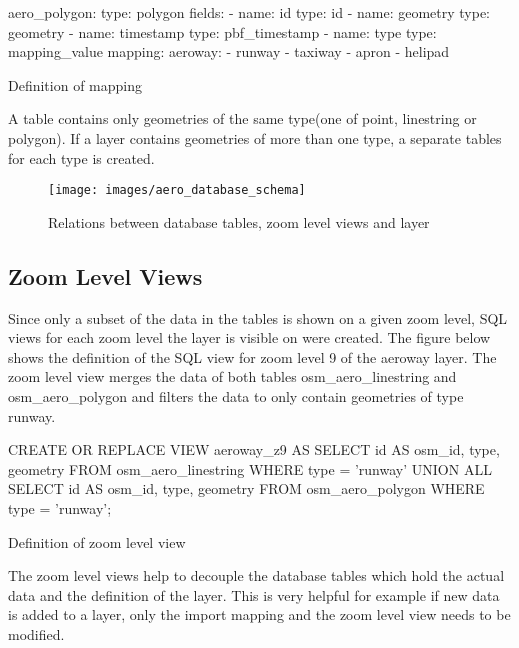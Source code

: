 \begin{listing}[H]
\begin{yamlcode}
aero_polygon:
  type: polygon
  fields:
  - name: id
    type: id
  - name: geometry
    type: geometry
  - name: timestamp
    type: pbf_timestamp
  - name: type
    type: mapping_value
  mapping:
    aeroway:
    - runway
    - taxiway
    - apron
    - helipad
\end{yamlcode}
\caption{Definition of mapping}
\label{definition_of_mapping}
\end{listing}

A table contains only geometries of the same type(one of point, linestring or polygon). If a layer contains geometries of more than one type, a separate tables for each type is created.

\begin{figure}[H]
\centering
\texttt{[image: images/aero\_database\_schema]}
\caption{Relations between database tables, zoom level views and layer}
\end{figure}

\subsection{Zoom Level Views}

Since only a subset of the data in the tables is shown on a given zoom level, SQL views for each zoom level the layer is visible on were created. The figure below shows the definition of the SQL view for zoom level 9 of the aeroway layer. The zoom level view merges the data of both tables osm\_aero\_linestring and osm\_aero\_polygon and filters the data to only contain geometries of type runway.

\begin{listing}[H]
\begin{sqlcode}
CREATE OR REPLACE VIEW aeroway_z9 AS
    SELECT id AS osm_id, type, geometry
    FROM osm_aero_linestring
    WHERE type = 'runway'
    UNION ALL
    SELECT id AS osm_id, type, geometry
    FROM osm_aero_polygon
    WHERE type = 'runway';
\end{sqlcode}
\caption{Definition of zoom level view}
\label{definition_of_zoom_level_view}
\end{listing}

The zoom level views help to decouple the database tables which hold the actual data and the definition of the layer. This is very helpful for example if new data is added to a layer, only the import mapping and the zoom level view needs to be modified.


